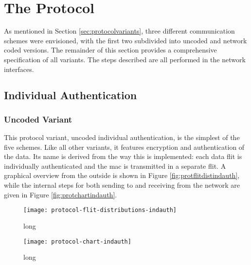 \section{The Protocol}\label{sec:theprotocol}
As mentioned in Section \ref{sec:protocolvariants}, three different communication schemes were envisioned, with the first two subdivided into uncoded
and network coded versions. The remainder of this section provides a comprehensive specification of all variants. The steps described are all
performed in the network interfaces.

\subsection{Individual Authentication}\label{subsec:indauth}
\subsubsection{Uncoded Variant}
This protocol variant, uncoded individual authentication, is the simplest of the five schemes. Like all other variants, it features encryption and
authentication of the data. Its name is derived from the way this is implemented: each data flit is individually authenticated and the \gls{mac} is
transmitted in a separate flit. A graphical overview from the outside is shown in Figure \vref{fig:protflitdistindauth}, while the internal steps for
both sending to and receiving from the network are given in Figure \vref{fig:protchartindauth}.

\begin{figure}
    \centering
    \texttt{[image: protocol-flit-distributions-indauth]}
    \caption[short]{long}
    \label{fig:protflitdistindauth}
\end{figure}

\begin{figure}
    \centering
    \texttt{[image: protocol-chart-indauth]}
    \caption[short]{long}
    \label{fig:protchartindauth}
\end{figure}

